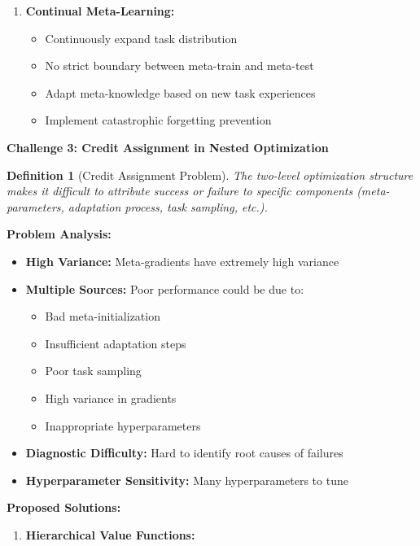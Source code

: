 \documentclass[12pt]{article}
\newcommand{\ieee}[1]{\textcolor{IEEEBlue}{\textbf{#1}}}
\newtheorem{definition}{Definition}
\begin{document}
{{\begin{enumerate}
				\item \textbf{Continual Meta-Learning:}
				
				\begin{itemize}
					\item Continuously expand task distribution
					\item No strict boundary between meta-train and meta-test
					\item Adapt meta-knowledge based on new task experiences
					\item Implement catastrophic forgetting prevention
				\end{itemize}
			\end{enumerate}
			
			\ieee{Challenge 3: Credit Assignment in Nested Optimization}
			
			\begin{definition}[Credit Assignment Problem]
			The two-level optimization structure makes it difficult to attribute success or failure to specific components (meta-parameters, adaptation process, task sampling, etc.).
			\end{definition}
			
			\textbf{Problem Analysis:}
			
			\begin{itemize}
				\item \textbf{High Variance:} Meta-gradients have extremely high variance
				\item \textbf{Multiple Sources:} Poor performance could be due to:
				\begin{itemize}
					\item Bad meta-initialization
					\item Insufficient adaptation steps
					\item Poor task sampling
					\item High variance in gradients
					\item Inappropriate hyperparameters
				\end{itemize}
				\item \textbf{Diagnostic Difficulty:} Hard to identify root causes of failures
				\item \textbf{Hyperparameter Sensitivity:} Many hyperparameters to tune
			\end{itemize}
			
			\textbf{Proposed Solutions:}
			
			\begin{enumerate}
				\item \textbf{Hierarchical Value Functions:}
				

\end{enumerate}}}
\end{document}
